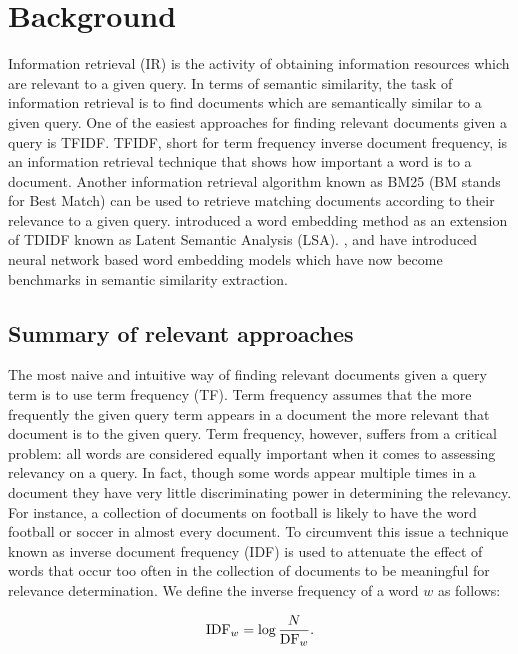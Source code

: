 \chapter{Background} 
\label{chapter:background}
Information retrieval (IR) is the activity of obtaining information resources which are relevant to a given query. In terms of semantic similarity, the task of information retrieval is to find documents which are semantically similar to a given query. One of the easiest approaches for finding relevant documents given a query is TFIDF.
TFIDF, short for term frequency inverse document frequency, is an information retrieval technique that shows how important a word is to a document. Another information retrieval algorithm known as BM25 (BM stands for Best Match) \cite{robertson2009probabilistic} can be used to retrieve matching documents according to their relevance to a given query. \cite{dumais2004latent} introduced a word embedding method as an extension of TDIDF known as Latent Semantic Analysis (LSA). \cite{mikolov2013efficient}, \cite{pennington2014glove} and \cite{shazeer2016swivel} have introduced neural network based word embedding models which have now become benchmarks in semantic similarity extraction.


\section{Summary of relevant approaches}
The most naive and intuitive way of finding relevant documents given a query term is to use term frequency (TF). Term frequency assumes that the more frequently the given query term appears in a document the more relevant that document is to the given query. Term frequency, however, suffers from a critical problem: all words are considered equally important when it comes to assessing relevancy on a query. In fact, though some words appear multiple times in a document they have very little discriminating power  in determining the relevancy. For instance, a collection of documents on football is likely to have the word football or soccer in almost every document. To circumvent this issue a technique known as inverse document frequency (IDF) is used to  attenuate the effect of words that occur too often in the collection of documents to be meaningful for relevance determination.
We define the inverse frequency of a word $w$ as follows:

\begin{displaymath}
\mbox{IDF}_w = \log {N\over \mbox{DF}_w}.
\end{displaymath}

